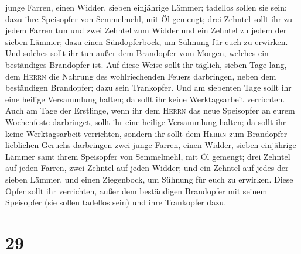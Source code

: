 junge Farren, einen Widder, sieben einjährige Lämmer; tadellos sollen
sie sein;  dazu ihre Speisopfer von Semmelmehl, mit Öl
gemengt; drei Zehntel sollt ihr zu jedem Farren tun und zwei Zehntel zum
Widder  und ein Zehntel zu jedem der sieben Lämmer;
 dazu einen Sündopferbock, um Sühnung für euch zu
erwirken.  Und solches sollt ihr tun außer dem Brandopfer
vom Morgen, welches ein beständiges Brandopfer ist.  Auf
diese Weise sollt ihr täglich, sieben Tage lang, dem \textsc{Herrn} die
Nahrung des wohlriechenden Feuers darbringen, neben dem beständigen
Brandopfer; dazu sein Trankopfer.  Und am siebenten Tage
sollt ihr eine heilige Versammlung halten; da sollt ihr keine
Werktagsarbeit verrichten.  Auch am Tage der Erstlinge,
wenn ihr dem \textsc{Herrn} das neue Speisopfer an eurem Wochenfeste
darbringet, sollt ihr eine heilige Versammlung halten; da sollt ihr
keine Werktagsarbeit verrichten,  sondern ihr sollt dem
\textsc{Herrn} zum Brandopfer lieblichen Geruchs darbringen zwei junge
Farren, einen Widder,  sieben einjährige Lämmer samt
ihrem Speisopfer von Semmelmehl, mit Öl gemengt; drei Zehntel auf jeden
Farren,  zwei Zehntel auf jeden Widder; und ein Zehntel
auf jedes der sieben Lämmer,  und einen Ziegenbock, um
Sühnung für euch zu erwirken.  Diese Opfer sollt ihr
verrichten, außer dem beständigen Brandopfer mit seinem Speisopfer (sie
sollen tadellos sein) und ihre Trankopfer dazu.

\hypertarget{section-28}{%
\section{29}\label{section-28}}

